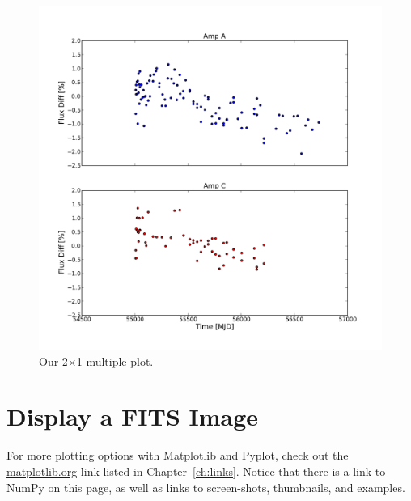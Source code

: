\begin{figure}[tbp]
  \centering
    \includegraphics[scale=0.35]{flux_vs_time_4.pdf}
    \caption{Our 2$\times$1 multiple plot.}
  \label{fig:flux_vs_time_4}
\end{figure}


\section{Display a FITS Image}





For more
plotting options with Matplotlib and Pyplot, check out the 
\href{http://matplotlib.org/}{matplotlib.org} link listed in
Chapter~\ref{ch:links}.  Notice that there is a link to NumPy on this
page, as well as links to screen-shots, thumbnails, and examples.

